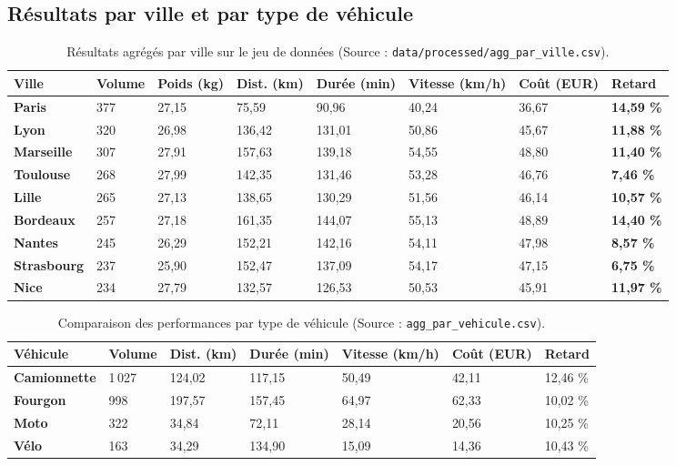 \documentclass[11pt,a4paper]{article}
\begin{document}
\subsection{R\'esultats par ville et par type de v\'ehicule}
\begin{table}[H]
\centering
\scriptsize
\begin{tabularx}{\textwidth}{@{}>{\bfseries}p{2.4cm} Y Y Y Y Y Y >{\bfseries}Y@{}}
\toprule
{} Ville & Volume & Poids (kg) & Dist. (km) & Dur\'ee (min) & Vitesse (km/h) & Co\^ut (EUR) & Retard \\
\midrule
Paris & 377 & 27,15 & 75,59 & 90,96 & 40,24 & 36,67 & 14,59 \% \\
 Lyon & 320 & 26,98 & 136,42 & 131,01 & 50,86 & 45,67 & 11,88 \% \\
Marseille & 307 & 27,91 & 157,63 & 139,18 & 54,55 & 48,80 & 11,40 \% \\
 Toulouse & 268 & 27,99 & 142,35 & 131,46 & 53,28 & 46,76 & 7,46 \% \\
Lille & 265 & 27,13 & 138,65 & 130,29 & 51,56 & 46,14 & 10,57 \% \\
 Bordeaux & 257 & 27,18 & 161,35 & 144,07 & 55,13 & 48,89 & 14,40 \% \\
Nantes & 245 & 26,29 & 152,21 & 142,16 & 54,11 & 47,98 & 8,57 \% \\
 Strasbourg & 237 & 25,90 & 152,47 & 137,09 & 54,17 & 47,15 & 6,75 \% \\
Nice & 234 & 27,79 & 132,57 & 126,53 & 50,53 & 45,91 & 11,97 \% \\
\bottomrule
\end{tabularx}
\caption{R\'esultats agr\'eg\'es par ville sur le jeu de donn\'ees (Source : \texttt{data/processed/agg\_par\_ville.csv}).}
\end{table}

\begin{table}[H]
\centering
\small
\begin{tabularx}{\textwidth}{@{}>{\bfseries}p{2.8cm} Y Y Y Y Y Y@{}}
\toprule
{} V\'ehicule & Volume & Dist. (km) & Dur\'ee (min) & Vitesse (km/h) & Co\^ut (EUR) & Retard \\
\midrule
Camionnette & 1\,027 & 124,02 & 117,15 & 50,49 & 42,11 & 12,46 \% \\
 Fourgon & 998 & 197,57 & 157,45 & 64,97 & 62,33 & 10,02 \% \\
Moto & 322 & 34,84 & 72,11 & 28,14 & 20,56 & 10,25 \% \\
 V\'elo & 163 & 34,29 & 134,90 & 15,09 & 14,36 & 10,43 \% \\
\bottomrule
\end{tabularx}
\caption{Comparaison des performances par type de v\'ehicule (Source : \texttt{agg\_par\_vehicule.csv}).}
\end{table}
\end{document}
